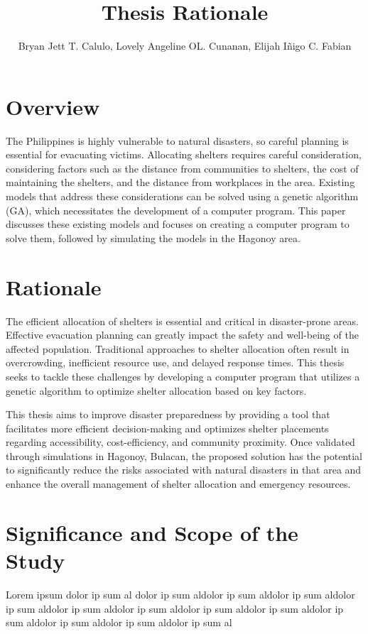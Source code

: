 \documentclass[english,10pt,a4paper]{article}
\title{Thesis Rationale}
\author{Bryan Jett T. Calulo, Lovely Angeline OL. Cunanan, Elijah Iñigo C. Fabian}
\begin{document}
	\maketitle
	
	\section*{Overview}
	The Philippines is highly vulnerable to natural disasters, so careful planning is essential for evacuating victims. Allocating shelters requires careful consideration, considering factors such as the distance from communities to shelters, the cost of maintaining the shelters, and the distance from workplaces in the area. Existing models that address these considerations can be solved using a genetic algorithm (GA), which necessitates the development of a computer program. This paper discusses these existing models and focuses on creating a computer program to solve them, followed by simulating the models in the Hagonoy area.
	
	\section*{Rationale}
	The efficient allocation of shelters is essential and critical in disaster-prone areas. Effective evacuation planning can greatly impact the safety and well-being of the affected population. Traditional approaches to shelter allocation often result in overcrowding, inefficient resource use, and delayed response times. This thesis seeks to tackle these challenges by developing a computer program that utilizes a genetic algorithm to optimize shelter allocation based on key factors.
	
	
	This thesis aims to improve disaster preparedness by providing a tool that facilitates more efficient decision-making and optimizes shelter placements regarding accessibility, cost-efficiency, and community proximity. Once validated through simulations in Hagonoy, Bulacan, the proposed solution has the potential to significantly reduce the risks associated with natural disasters in that area and enhance the overall management of shelter allocation and emergency resources.
	
	\section*{Significance and Scope of the Study}
	Lorem ipsum dolor ip sum al dolor ip sum aldolor ip sum aldolor ip sum aldolor ip sum aldolor ip sum aldolor ip sum aldolor ip sum aldolor ip sum aldolor ip sum aldolor ip sum aldolor ip sum aldolor ip sum al
	
\end{document}

